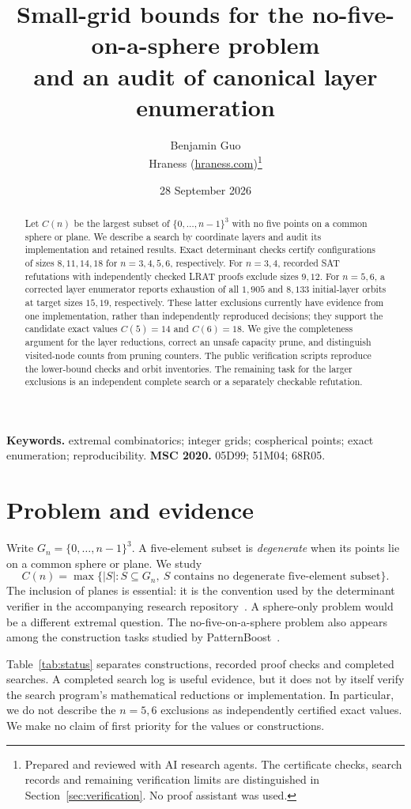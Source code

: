 \documentclass[11pt,a4paper]{article}
\title{Small-grid bounds for the no-five-on-a-sphere problem\\and an audit of canonical layer enumeration}
\author{Benjamin Guo\\Hraness (\url{hraness.com})\thanks{Prepared and reviewed with AI research agents. The certificate checks, search records and remaining verification limits are distinguished in Section~\ref{sec:verification}. No proof assistant was used.}}
\date{28 September 2026}
\begin{document}
\maketitle
\begin{abstract}
Let $C(n)$ be the largest subset of $\{0,\ldots,n-1\}^3$ with no five points on a common sphere or plane. We describe a search by coordinate layers and audit its implementation and retained results. Exact determinant checks certify configurations of sizes $8,11,14,18$ for $n=3,4,5,6$, respectively. For $n=3,4$, recorded SAT refutations with independently checked LRAT proofs exclude sizes $9,12$. For $n=5,6$, a corrected layer enumerator reports exhaustion of all $1{,}905$ and $8{,}133$ initial-layer orbits at target sizes $15,19$, respectively. These latter exclusions currently have evidence from one implementation, rather than independently reproduced decisions; they support the candidate exact values $C(5)=14$ and $C(6)=18$. We give the completeness argument for the layer reductions, correct an unsafe capacity prune, and distinguish visited-node counts from pruning counters. The public verification scripts reproduce the lower-bound checks and orbit inventories. The remaining task for the larger exclusions is an independent complete search or a separately checkable refutation.
\end{abstract}
\medskip\noindent\textbf{Keywords.} extremal combinatorics; integer grids; cospherical points; exact enumeration; reproducibility.
\smallskip\noindent\textbf{MSC 2020.} 05D99; 51M04; 68R05.

\section{Problem and evidence}
Write $G_n=\{0,\ldots,n-1\}^3$. A five-element subset is \emph{degenerate} when its points lie on a common sphere or plane. We study
\[
 C(n)=\max\{|S|:S\subseteq G_n,\ S\text{ contains no degenerate five-element subset}\}.
\]
The inclusion of planes is essential: it is the convention used by the determinant verifier in the accompanying research repository~\cite{repository}. A sphere-only problem would be a different extremal question. The no-five-on-a-sphere problem also appears among the construction tasks studied by PatternBoost~\cite{patternboost}.

Table~\ref{tab:status} separates constructions, recorded proof checks and completed searches. A completed search log is useful evidence, but it does not by itself verify the search program's mathematical reductions or implementation. In particular, we do not describe the $n=5,6$ exclusions as independently certified exact values. We make no claim of first priority for the values or constructions.
\end{document}
